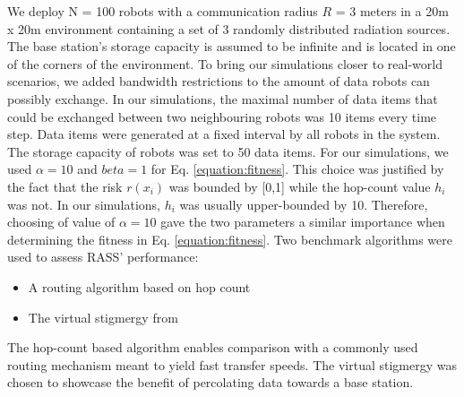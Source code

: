 We deploy N = 100 robots with a communication radius $R$ = 3 meters in a 20m x 20m environment containing a set of 3 randomly distributed radiation sources. The base station's storage capacity is assumed to be infinite and is located in one of the corners of the environment. To bring our simulations closer to real-world scenarios, we added bandwidth restrictions to the amount of data robots can possibly exchange. In our simulations, the maximal number of data items that could be exchanged between two neighbouring robots was 10 items every time step. Data items were generated at a fixed interval by all robots in the system. The storage capacity of robots was set to 50 data items. For our simulations, we used $\alpha = 10$ and $beta = 1$ for Eq. \ref{equation:fitness}. This choice was justified by the fact that the risk $r({x_i})$ was bounded by [0,1] while the hop-count value $h_i$ was not. In our simulations, $h_i$ was usually upper-bounded by 10. Therefore, choosing of value of $\alpha = 10$ gave the two parameters a similar importance when determining the fitness in Eq. \ref{equation:fitness}. Two benchmark algorithms were used to assess RASS' performance:

\begin{itemize}
    \item A routing algorithm based on hop count 
    \item The virtual stigmergy from \cite{pinciroliTuple2016}
\end{itemize}

The hop-count based algorithm enables comparison with a commonly used routing mechanism meant to yield fast transfer speeds. The virtual stigmergy was chosen to showcase the benefit of percolating data towards a base station.

